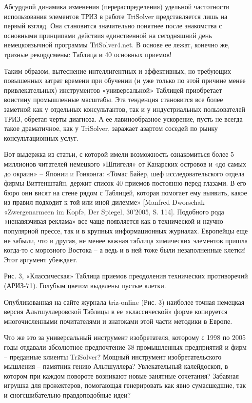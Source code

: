 \documentclass[11pt,a4paper]{article}
\begin{document}
Абсурдной динамика изменения (перераспределения) удельной частотности
использования элементов ТРИЗ в работе TriSolver представляется лишь на первый
взгляд. Она становится значительно понятнее после знакомства с основными
принципами действия единственной на сегодняшний день немецкоязычной программы
TriSolver4.net. В основе ее лежат, конечно же, тризные рекордсмены: Таблица и
40 основных приемов!

Таким образом, вытеснение интеллигентных и эффективных, но требующих
повышенных затрат времени при обучении (и уже только по этой причине менее
привлекательных) инструментов «универсальной» Таблицей приобретает воистину
промышленные масштабы. Эта тенденция становится все более заметной как у
отдельных консультантов, так и у индустриальных пользователей ТРИЗ, обретая
черты диагноза. А ее лавинообразное ускорение, пусть не всегда такое
драматичное, как у TriSolver, заражает азартом соседей по рынку
консультационных услуг.

Вот выдержка из статьи, с которой имели возможность ознакомиться более 5
миллионов читателей немецкого «Шпигеля» от Канарских островов и «до самых до
окраин» -- Японии и Гонконга: «Томас Байер, шеф исследовательского отдела
фирмы Виттенштайн, держит список 40 приемов постоянно перед глазами. В его
бюро они висят на стене рядом с Таблицей, которая помогает ему выявить, какое
из правил подходит к той или иной дилемме» [Manfred Dworschak «Zwergenarmeen
  im Kopf», Der Spiegel, 30'2005, S. 114]. Подобного рода «ненавязчивая
реклама» все чаще появляется как в технической и научно-популярной прессе, так
и в крупных информационных журналах. Европейцы еще не забыли, что и другая, не
менее важная таблица химических элементов пришла когда-то с морозного Востока
-- а ведь и в ней тоже были незаполненные клетки! Этот аргумент убеждает.

Рис. 3, «Классическая» Таблица приемов преодоления технических противоречий
(АРИЗ-71). Голубым цветом выделены пустые клетки.

Опубликованная на сайте журнала triz-online (Рис. 3) наиболее точная немецкая
версия Альтшуллеровской Таблицы в ее «классической» форме копируется
многочисленными почитателями и знатоками этой части методики в Европе.

Что же это за универсальный инструмент изобретателя, которому с 1998 по 2005
годы отдавали абсолютное предпочтение 38 промышленных предприятий и фирм --
преданные клиенты TriSolver? Мощный инструмент изобретательского мышления --
памятник гению Альтшуллера? Увлекательный калейдоскоп, в котором при каждом
повороте возникают новые занятные сочетания? Забавная игрушка для прожектеров,
помогающая генерировать как явно сумасшедшие, так и сногсшибательно
правдоподобные идеи?
\end{document}
